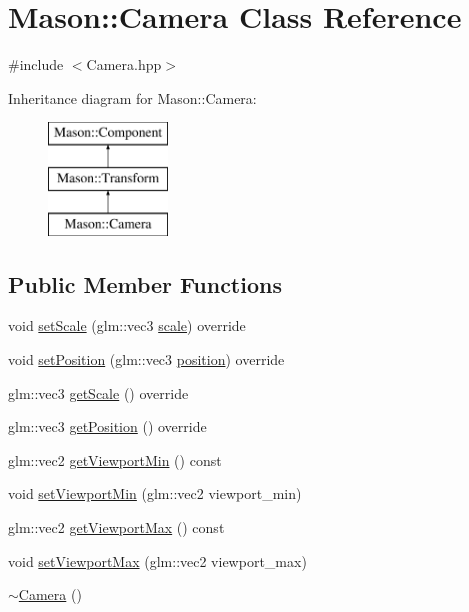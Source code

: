\hypertarget{class_mason_1_1_camera}{}\section{Mason\+:\+:Camera Class Reference}
\label{class_mason_1_1_camera}


{\ttfamily \#include $<$Camera.\+hpp$>$}

Inheritance diagram for Mason\+:\+:Camera\+:\begin{figure}[H]
\begin{center}
\leavevmode
\includegraphics[height=3.000000cm]{class_mason_1_1_camera}
\end{center}
\end{figure}
\subsection*{Public Member Functions}
\begin{DoxyCompactItemize}
\item 
void \hyperlink{class_mason_1_1_camera_a732501ee31e862f557bbbc8ff58631a4}{set\+Scale} (glm\+::vec3 \hyperlink{class_mason_1_1_transform_a4618b31e34a6ec8a0ee638401fc56367}{scale}) override
\item 
void \hyperlink{class_mason_1_1_camera_a69f184af46d081b85209040bbe814cbb}{set\+Position} (glm\+::vec3 \hyperlink{class_mason_1_1_transform_ac9e11b4ec4433a38ac1100f12c955dcb}{position}) override
\item 
glm\+::vec3 \hyperlink{class_mason_1_1_camera_a405b26eaaae2ab7a460dfc319a9d16ea}{get\+Scale} () override
\item 
glm\+::vec3 \hyperlink{class_mason_1_1_camera_a71560b8b6216a542ae1958bd91a4361d}{get\+Position} () override
\item 
glm\+::vec2 \hyperlink{class_mason_1_1_camera_a0d2d26d8b7b80ab508ed4f4f537614b5}{get\+Viewport\+Min} () const
\item 
void \hyperlink{class_mason_1_1_camera_aa630259d7e0c0124dec5c9aaf33b7160}{set\+Viewport\+Min} (glm\+::vec2 viewport\+\_\+min)
\item 
glm\+::vec2 \hyperlink{class_mason_1_1_camera_abe43550148e85f5a32919a3c8b8ff115}{get\+Viewport\+Max} () const
\item 
void \hyperlink{class_mason_1_1_camera_a1f9a7896bb617d1402e3c4738324e1ea}{set\+Viewport\+Max} (glm\+::vec2 viewport\+\_\+max)
\item 
\hyperlink{class_mason_1_1_camera_ad1897942d0ccf91052386388a497349f}{$\sim$\+Camera} ()
\end{DoxyCompactItemize}
